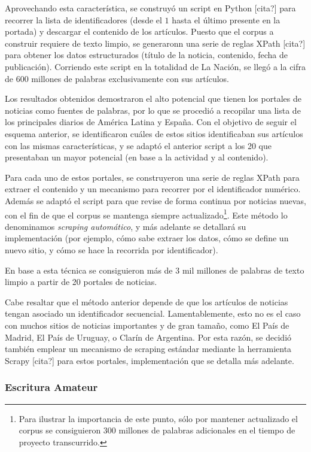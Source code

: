 Aprovechando esta característica, se construyó un script en Python [cita?] para recorrer la lista de
identificadores (desde el $1$ hasta el último presente en la portada) y descargar el contenido de
los artículos. Puesto que el corpus a construir requiere de texto limpio, se generaronn una serie de
reglas XPath [cita?] para obtener los datos estructurados (título de la noticia, contenido, fecha de
publicación). Corriendo este script en la totalidad de La Nación, se llegó a la cifra de 600
millones de palabras exclusivamente con sus artículos.

Los resultados obtenidos demostraron el alto potencial que tienen los portales de noticias como
fuentes de palabras, por lo que se procedió a recopilar una lista de los principales diarios de
América Latina y España. Con el objetivo de seguir el esquema anterior, se identificaron cuáles de
estos sitios identificaban sus artículos con las mismas características, y se adaptó el anterior
script a los 20 que presentaban un mayor potencial (en base a la actividad y al contenido).

Para cada uno de estos portales, se construyeron una serie de reglas XPath para extraer el contenido
y un mecanismo para recorrer por el identificador numérico. Además se adaptó el script para que
revise de forma continua por noticias nuevas, con el fin de que el corpus se mantenga siempre
actualizado\footnote{Para ilustrar la importancia de este punto, sólo por mantener actualizado el
corpus se consiguieron 300 millones de palabras adicionales en el tiempo de proyecto
transcurrido.}. Este método lo denominamos \textit{scraping automático}, y más adelante se detallará
su implementación (por ejemplo, cómo sabe extraer los datos, cómo se define un nuevo sitio, y cómo se
hace la recorrida por identificador).

En base a esta técnica se consiguieron más de 3 mil millones de palabras de texto limpio a partir de
20 portales de noticias.


Cabe resaltar que el método anterior depende de que los artículos de noticias tengan asociado un
identificador secuencial. Lamentablemente, esto no es el caso con muchos sitios de noticias
importantes y de gran tamaño, como El País de Madrid, El País de Uruguay, o Clarín de Argentina. Por
esta razón, se decidió también emplear un mecanismo de scraping estándar mediante la herramienta
Scrapy [cita?] para estos portales, implementación que se detalla más adelante.


\subsubsection{Escritura Amateur}

